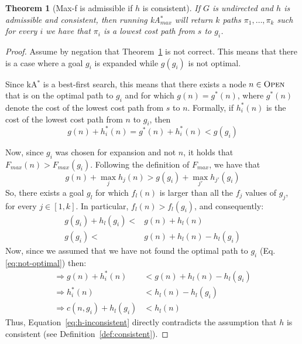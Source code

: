 \documentclass{aicom2e}
\newtheorem{theorem}{Theorem}
\newcommand{\kastar}{kA$^*$}
\newcommand{\kastarmax}{kA$^*_{max}$}
\newcommand{\maxf}{Max-f}
\newcommand{\open}{\textsc{Open}}
\begin{document}
 
\begin{theorem}[\maxf{} is admissible if $h$ is consistent]
If $G$ is undirected and $h$ is admissible and consistent, 
then running \kastarmax{} will return $k$ paths $\pi_1,\ldots, \pi_k$ such for every $i$ we have that $\pi_i$ is a lowest cost path from $s$ to $g_i$. 
\label{the:max-f}
\end{theorem}
 \begin{proof}
 Assume by negation that Theorem~\ref{the:max-f} is not correct. This means
 that there is a case where a goal $g_i$ is expanded while $g(g_i)$ is not optimal. 
 
 Since \kastar{} is a best-first search, this means that there exists a node $n\in \open{}$ that is on the optimal path to $g_i$ and for which $g(n)=g^*(n)$, where $g^*(n)$ denote the cost of the lowest cost path from $s$ to $n$. Formally, 
 if $h^*_i(n)$ is the cost of the lowest cost path from $n$ to $g_i$, then
 \begin{equation}
     g(n)+h_i^*(n) = g^*(n)+h_i^*(n) < g(g_i)
    \label{eq:not-optimal}
 \end{equation}
 
 Now, since $g_i$ was chosen for expansion and not $n$, it holds that $F_{max}(n)  > F_{max}(g_i)$. Following the definition of $F_{max}$, we have that
 \begin{equation}
     g(n)+\max_j h_j(n) > g(g_i) + \max_{j'} h_{j'}(g_i)
 \end{equation}
 So, there exists a goal $g_l$ for which $f_l(n)$ is larger than 
 all the $f_j$ values of $g_j$, for every $j\in [1,k]$. In particular, 
 $f_l(n)>f_l(g_i)$, and consequently:
 \begin{align}
     g(g_i)+h_l(g_i) < & g(n)+h_l(n) \\
     g(g_i) < & g(n)+h_l(n) - h_l(g_i) 
 \end{align} 
Now, since we assumed that we have not found the optimal path to $g_i$ (Eq.~ \ref{eq:not-optimal}) then:
\begin{align}
\Rightarrow g(n)+h^*_i(n)  & < g(n)+h_l(n) - h_l(g_i)\\
\Rightarrow h^*_i(n)  & < h_l(n) - h_l(g_i)\\
\Rightarrow c(n,g_i) + h_l(g_i) & < h_l(n) \label{eq:h-inconsistent} 
\end{align}
Thus, Equation~\ref{eq:h-inconsistent} directly contradicts the assumption
that $h$ is consistent (see Definition~\ref{def:consistent}). 
\end{proof} 
\end{document}

